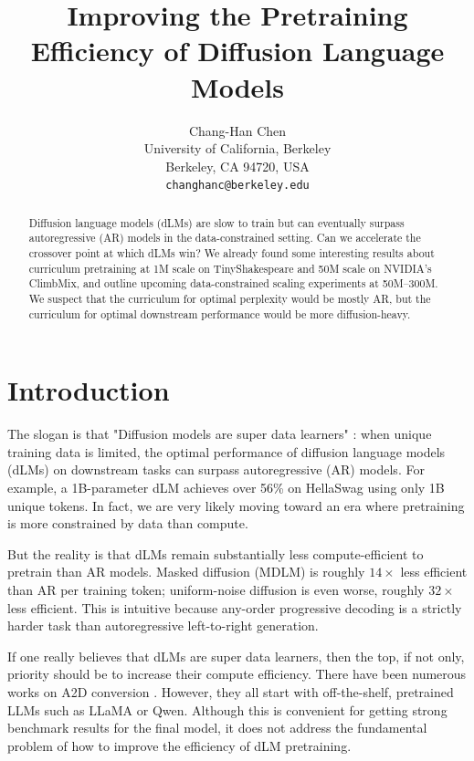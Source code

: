\documentclass{article}
\title{Improving the Pretraining Efficiency of Diffusion Language Models}
\author{Chang-Han Chen \\
University of California, Berkeley\\
Berkeley, CA 94720, USA \\
\texttt{changhanc@berkeley.edu}
}
\begin{document}
\maketitle

\begin{abstract}
Diffusion language models (dLMs) are slow to train but can eventually surpass autoregressive (AR) models in the data-constrained setting. Can we accelerate the crossover point at which dLMs win? We already found some interesting results about curriculum pretraining at 1M scale on TinyShakespeare and 50M scale on NVIDIA's ClimbMix, and outline upcoming data-constrained scaling experiments at 50M--300M. We suspect that the curriculum for optimal perplexity would be mostly AR, but the curriculum for optimal downstream performance would be more diffusion-heavy.
\end{abstract}

\section{Introduction}
\label{sec:intro}

The slogan is that "Diffusion models are super data learners" \citet{ni2025diffusionlanguagemodelssuper}: when unique training data is limited, the optimal performance of diffusion language models (dLMs) on downstream tasks can surpass autoregressive (AR) models. For example, a 1B-parameter dLM achieves over 56\% on HellaSwag using only 1B unique tokens. In fact, we are very likely moving toward an era where pretraining is more constrained by data than compute. 

But the reality is that dLMs remain substantially less compute-efficient to pretrain than AR models. Masked diffusion (MDLM) is roughly $14\times$ less efficient than AR per training token; uniform-noise diffusion is even worse, roughly $32\times$ less efficient. This is intuitive because any-order progressive decoding is a strictly harder task than autoregressive left-to-right generation.

If one really believes that dLMs are super data learners, then the top, if not only, priority should be to increase their compute efficiency.
There have been numerous works on A2D conversion \citep{efficientdlm2025, nbdiff2025, llada2_2025, sdar2025}. However, they all start with off-the-shelf, pretrained LLMs such as LLaMA or Qwen. Although this is convenient for getting strong benchmark results for the final model, it does not address the fundamental problem of how to improve the efficiency of dLM pretraining.
\end{document}
